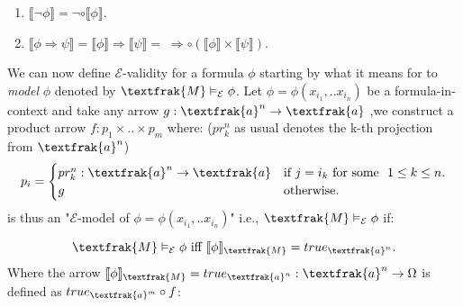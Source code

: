\begin{definition}[$\llbracket  \phi \rrbracket$]
\begin{enumerate}
		\item $\llbracket \neg \phi \rrbracket = \neg \circ \llbracket \phi \rrbracket$.
		
		\item $\llbracket \phi \Rightarrow \psi \rrbracket = \llbracket \phi \rrbracket \Rightarrow \llbracket \psi \rrbracket =\; \Rightarrow \circ (\llbracket \phi \rrbracket \times \llbracket \psi \rrbracket) $.
	\end{enumerate}		

\end{definition}

We can now define $\mathcal{E}$-validity for a formula $\phi$ starting by what it means for  to \emph{model} $\phi$ denoted by $\textfrak{M} \vDash_\mathcal{E} \phi$. \newline
Let $\phi = \phi(x_{i_1},..x_{i_n})$ be a formula-in-context and take any arrow $g: \textfrak{a}^n \rightarrow \textfrak{a}$ 	,we construct a product arrow $f: p_1 \times .. \times p_m$ where: ($pr_k^n$ as usual denotes the k-th projection from $\textfrak{a}^n$)
\begin{equation*}
	p_i =
	\begin{cases}
		pr_k^n : \textfrak{a}^n \rightarrow \textfrak{a} & \text{if } j=i_k \text{ for some } \  1 \leq k \leq n.\\
		g  & \text{otherwise}.
	\end{cases}   
\end{equation*}  
 is thus an "$\mathcal{E}$-model of $\phi = \phi(x_{i_1},..x_{i_n})$" i.e., $\textfrak{M} \vDash_\mathcal{E} \phi$ if:

\begin{definition}
	\begin{equation*}
		\textfrak{M} \vDash_\mathcal{E} \phi\text{ iff }\llbracket \phi \rrbracket_\textfrak{M} = true_{\textfrak{a}^n}.
	\end{equation*}
		Where the arrow $\llbracket \phi \rrbracket_\textfrak{M} = true_{\textfrak{a}^n} : \textfrak{a}^n \rightarrow \Omega$ is defined as $ true_{\textfrak{a}^m} \circ f$:
	\begin{figure}[h]
		\centering
		\
	\end{figure}
\end{definition}

